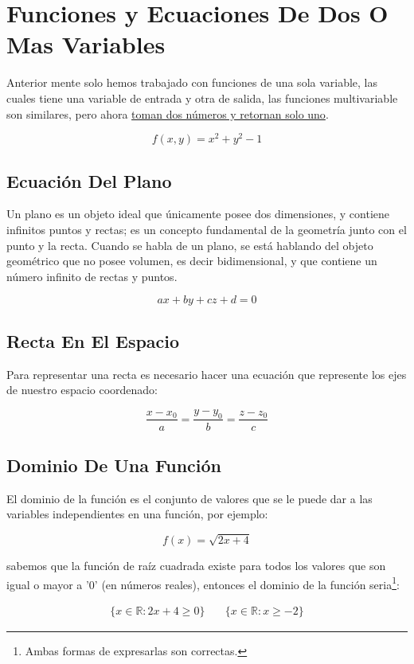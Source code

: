 \documentclass{article}
\begin{document}
\section{Funciones y Ecuaciones De Dos O Mas Variables}
\label{sec:orgc5f135f}
Anterior mente solo hemos trabajado con funciones de una sola variable, las cuales tiene una variable de entrada y otra de salida, las funciones multivariable son similares, pero ahora \uline{toman dos números y retornan solo uno}. 

\[
f(x,y) = x^2 + y^2 - 1
\]

\subsection{Ecuación Del Plano}
\label{sec:org65200a2}
Un plano es un objeto ideal que únicamente posee dos dimensiones, y contiene infinitos puntos y rectas; es un concepto fundamental de la geometría junto con el punto y la recta. Cuando se habla de un plano, se está hablando del objeto geométrico que no posee volumen, es decir bidimensional, y que contiene un número infinito de rectas y puntos. 

\[ax+by+cz+d=0\]

\subsection{Recta En El Espacio}
\label{sec:org592652f}
Para representar una recta es necesario hacer una ecuación que represente los ejes de nuestro espacio coordenado:

\[
\frac{x-x_0}{a} = \frac{y-y_0}{b} = \frac{z-z_0}{c}
\]

\subsection{Dominio De Una Función}
\label{sec:orgbddb764}
El dominio de la función es el conjunto de valores que se le puede dar a las variables independientes en una función, por ejemplo:

\[
f(x) = \sqrt{2x+4}
\]

sabemos que la función de raíz cuadrada existe para todos los valores que son igual o mayor a '0' (en números reales), entonces el dominio de la función seria\footnote{Ambas formas de expresarlas son correctas.}:

\[ \begin{aligned}
\{x\in\mathbb{R}:2x+4 \geq 0\} &~& \{x\in\mathbb{R}:x \geq -2\}
\end{aligned} \]
\end{document}
